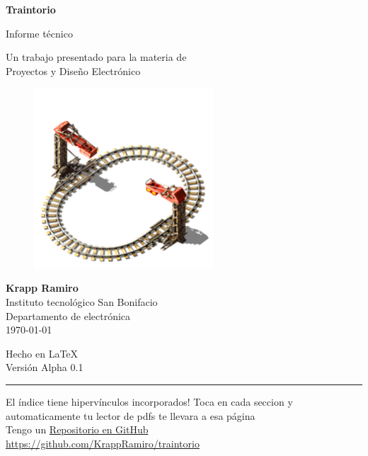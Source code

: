 \documentclass{article}
\begin{document}
\begin{titlepage}
	\begin{center}
		\vspace{1cm}

		{\Huge
			\textbf{Traintorio}}

		\vspace{0.3cm}
		{\LARGE
			Informe técnico}

		\vspace{0.5cm}
		{\Large
			Un trabajo presentado para la materia de \\
			Proyectos y Diseño Electrónico}

		\vspace{2cm}

		\begin{figure}[H]
			\centering
			\includegraphics[width=0.6\textwidth]{logo.png}
		\end{figure}

		\vfill

		{\Large
			\textbf{Krapp Ramiro} \\
			\vspace{0.5cm}
			Instituto tecnológico San Bonifacio\\
			Departamento de electrónica\\
			\today
		}

		\vspace{0.5cm}
		{\large Hecho en {\LaTeX}\\
			Versión Alpha 0.1}

	\end{center}
\end{titlepage}

\tableofcontents		\noindent\rule{\textwidth}{0.7pt}
El índice tiene hipervínculos incorporados!
Toca en cada seccion y automaticamente tu lector de pdfs te llevara a esa página
\\[12pt] %
{\large Tengo un
\href{https://github.com/KrappRamiro/traintorio}{Repositorio en GitHub}}\\
{\small \url{https://github.com/KrappRamiro/traintorio}}
\end{document}

